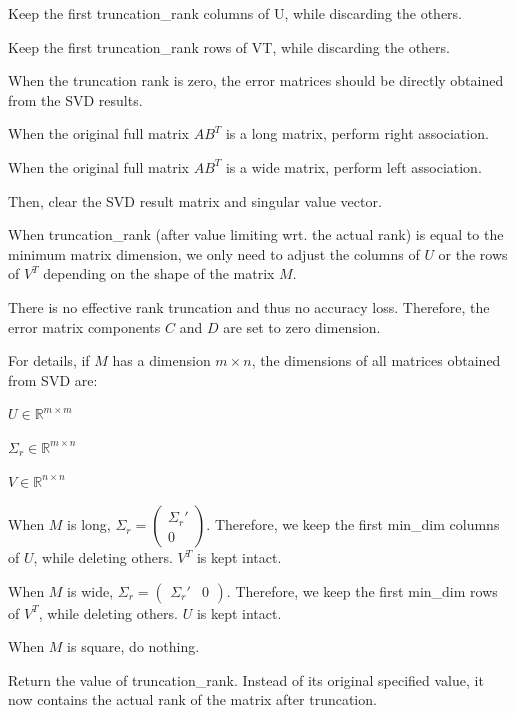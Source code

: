 \begin{DoxyDescription}
\begin{DoxyEnumerate}
\item Keep the first {\ttfamily truncation\+\_\+rank} columns of {\ttfamily U}, while discarding the others.
\item Keep the first {\ttfamily truncation\+\_\+rank} rows of {\ttfamily VT}, while discarding the others.
\end{DoxyEnumerate}

When the truncation rank is zero, the error matrices should be directly obtained from the S\+VD results.

When the original full matrix $AB^T$ is a long matrix, perform right association.

When the original full matrix $AB^T$ is a wide matrix, perform left association.

Then, clear the S\+VD result matrix and singular value vector.

When {\ttfamily truncation\+\_\+rank} (after value limiting wrt. the actual rank) is equal to the minimum matrix dimension, we only need to adjust the columns of $U$ or the rows of $V^T$ depending on the shape of the matrix $M$.

There is no effective rank truncation and thus no accuracy loss. Therefore, the error matrix components $C$ and $D$ are set to zero dimension.

For details, if $M$ has a dimension $m \times n$, the dimensions of all matrices obtained from S\+VD are\+:
\begin{DoxyItemize}
\item $U \in \mathbb{R}^{m \times m}$
\item $\Sigma_r \in \mathbb{R}^{m \times n}$
\item $V \in \mathbb{R}^{n \times n}$
\end{DoxyItemize}

When $M$ is long, $\Sigma_r = \begin{pmatrix}\Sigma_r' \\ 0 \end{pmatrix}$. Therefore, we keep the first {\ttfamily min\+\_\+dim} columns of $U$, while deleting others. $V^T$ is kept intact.

When $M$ is wide, $\Sigma_r = \begin{pmatrix} \Sigma_r' & 0 \end{pmatrix}$. Therefore, we keep the first {\ttfamily min\+\_\+dim} rows of $V^T$, while deleting others. $U$ is kept intact.

When $M$ is square, do nothing.

Return the value of {\ttfamily truncation\+\_\+rank}. Instead of its original specified value, it now contains the actual rank of the matrix after truncation.


\end{DoxyDescription}

